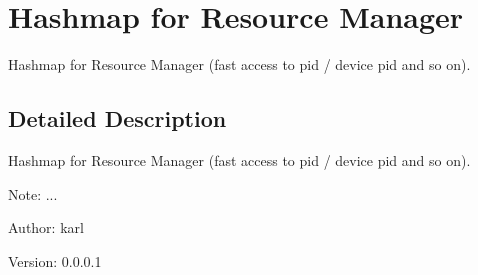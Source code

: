 \hypertarget{group___h_a_s_h_m_a_p}{
\section{Hashmap for Resource Manager}
\label{group___h_a_s_h_m_a_p}
}
Hashmap for Resource Manager (fast access to pid / device pid and so on).  




\subsection{Detailed Description}
Hashmap for Resource Manager (fast access to pid / device pid and so on). 

\begin{Desc}
\item[Note:]... \end{Desc}
\begin{Desc}
\item[Author:]karl \end{Desc}
\begin{Desc}
\item[Version:]0.0.0.1 \end{Desc}
